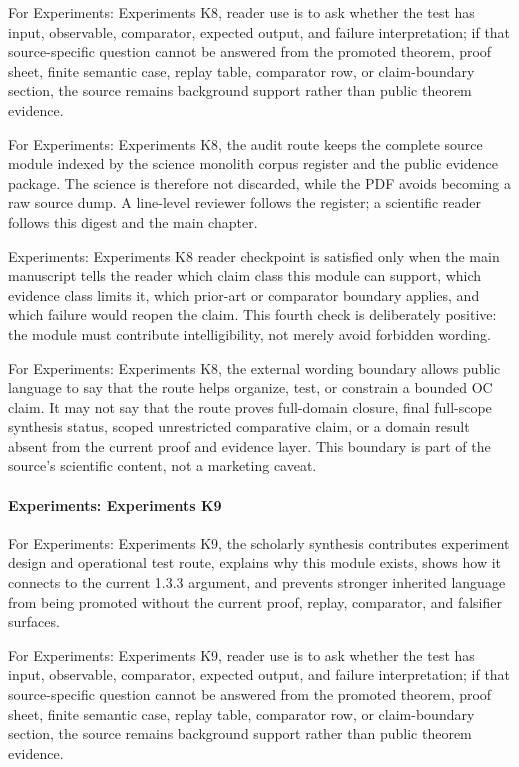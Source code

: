 For Experiments: Experiments K8, reader use is to ask whether the test has input, observable, comparator, expected output, and failure interpretation; if that source-specific question cannot be answered from the promoted theorem, proof sheet, finite semantic case, replay table, comparator row, or claim-boundary section, the source remains background support rather than public theorem evidence.


For Experiments: Experiments K8, the audit route keeps the complete source module indexed by the science monolith corpus register and the public evidence package. The science is therefore not discarded, while the PDF avoids becoming a raw source dump. A line-level reviewer follows the register; a scientific reader follows this digest and the main chapter.


Experiments: Experiments K8 reader checkpoint is satisfied only when the main manuscript tells the reader which claim class this module can support, which evidence class limits it, which prior-art or comparator boundary applies, and which failure would reopen the claim. This fourth check is deliberately positive: the module must contribute intelligibility, not merely avoid forbidden wording.


For Experiments: Experiments K8, the external wording boundary allows public language to say that the route helps organize, test, or constrain a bounded OC claim. It may not say that the route proves full-domain closure, final full-scope synthesis status, scoped unrestricted comparative claim, or a domain result absent from the current proof and evidence layer. This boundary is part of the source's scientific content, not a marketing caveat.


\paragraph{Experiments: Experiments K9}

For Experiments: Experiments K9, the scholarly synthesis contributes experiment design and operational test route, explains why this module exists, shows how it connects to the current 1.3.3 argument, and prevents stronger inherited language from being promoted without the current proof, replay, comparator, and falsifier surfaces.


For Experiments: Experiments K9, reader use is to ask whether the test has input, observable, comparator, expected output, and failure interpretation; if that source-specific question cannot be answered from the promoted theorem, proof sheet, finite semantic case, replay table, comparator row, or claim-boundary section, the source remains background support rather than public theorem evidence.


